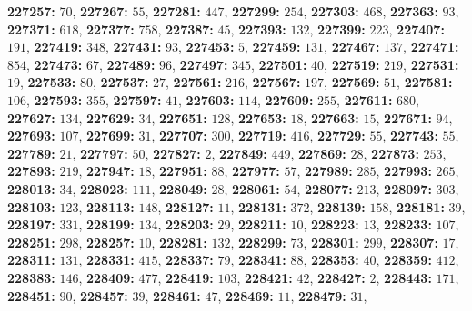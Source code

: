 \textsf{\bfseries 227257:} $70$, \textsf{\bfseries 227267:} $55$, \textsf{\bfseries 227281:} $447$, \textsf{\bfseries 227299:} $254$, \textsf{\bfseries 227303:} $468$, \textsf{\bfseries 227363:} $93$, \textsf{\bfseries 227371:} $618$, \textsf{\bfseries 227377:} $758$, \textsf{\bfseries 227387:} $45$, \textsf{\bfseries 227393:} $132$, \textsf{\bfseries 227399:} $223$, \textsf{\bfseries 227407:} $191$, \textsf{\bfseries 227419:} $348$, \textsf{\bfseries 227431:} $93$, \textsf{\bfseries 227453:} $5$, \textsf{\bfseries 227459:} $131$, \textsf{\bfseries 227467:} $137$, \textsf{\bfseries 227471:} $854$, \textsf{\bfseries 227473:} $67$, \textsf{\bfseries 227489:} $96$, \textsf{\bfseries 227497:} $345$, \textsf{\bfseries 227501:} $40$, \textsf{\bfseries 227519:} $219$, \textsf{\bfseries 227531:} $19$, \textsf{\bfseries 227533:} $80$, \textsf{\bfseries 227537:} $27$, \textsf{\bfseries 227561:} $216$, \textsf{\bfseries 227567:} $197$, \textsf{\bfseries 227569:} $51$, \textsf{\bfseries 227581:} $106$, \textsf{\bfseries 227593:} $355$, \textsf{\bfseries 227597:} $41$, \textsf{\bfseries 227603:} $114$, \textsf{\bfseries 227609:} $255$, \textsf{\bfseries 227611:} $680$, \textsf{\bfseries 227627:} $134$, \textsf{\bfseries 227629:} $34$, \textsf{\bfseries 227651:} $128$, \textsf{\bfseries 227653:} $18$, \textsf{\bfseries 227663:} $15$, \textsf{\bfseries 227671:} $94$, \textsf{\bfseries 227693:} $107$, \textsf{\bfseries 227699:} $31$, \textsf{\bfseries 227707:} $300$, \textsf{\bfseries 227719:} $416$, \textsf{\bfseries 227729:} $55$, \textsf{\bfseries 227743:} $55$, \textsf{\bfseries 227789:} $21$, \textsf{\bfseries 227797:} $50$, \textsf{\bfseries 227827:} $2$, \textsf{\bfseries 227849:} $449$, \textsf{\bfseries 227869:} $28$, \textsf{\bfseries 227873:} $253$, \textsf{\bfseries 227893:} $219$, \textsf{\bfseries 227947:} $18$, \textsf{\bfseries 227951:} $88$, \textsf{\bfseries 227977:} $57$, \textsf{\bfseries 227989:} $285$, \textsf{\bfseries 227993:} $265$, \textsf{\bfseries 228013:} $34$, \textsf{\bfseries 228023:} $111$, \textsf{\bfseries 228049:} $28$, \textsf{\bfseries 228061:} $54$, \textsf{\bfseries 228077:} $213$, \textsf{\bfseries 228097:} $303$, \textsf{\bfseries 228103:} $123$, \textsf{\bfseries 228113:} $148$, \textsf{\bfseries 228127:} $11$, \textsf{\bfseries 228131:} $372$, \textsf{\bfseries 228139:} $158$, \textsf{\bfseries 228181:} $39$, \textsf{\bfseries 228197:} $331$, \textsf{\bfseries 228199:} $134$, \textsf{\bfseries 228203:} $29$, \textsf{\bfseries 228211:} $10$, \textsf{\bfseries 228223:} $13$, \textsf{\bfseries 228233:} $107$, \textsf{\bfseries 228251:} $298$, \textsf{\bfseries 228257:} $10$, \textsf{\bfseries 228281:} $132$, \textsf{\bfseries 228299:} $73$, \textsf{\bfseries 228301:} $299$, \textsf{\bfseries 228307:} $17$, \textsf{\bfseries 228311:} $131$, \textsf{\bfseries 228331:} $415$, \textsf{\bfseries 228337:} $79$, \textsf{\bfseries 228341:} $88$, \textsf{\bfseries 228353:} $40$, \textsf{\bfseries 228359:} $412$, \textsf{\bfseries 228383:} $146$, \textsf{\bfseries 228409:} $477$, \textsf{\bfseries 228419:} $103$, \textsf{\bfseries 228421:} $42$, \textsf{\bfseries 228427:} $2$, \textsf{\bfseries 228443:} $171$, \textsf{\bfseries 228451:} $90$, \textsf{\bfseries 228457:} $39$, \textsf{\bfseries 228461:} $47$, \textsf{\bfseries 228469:} $11$, \textsf{\bfseries 228479:} $31$, 
